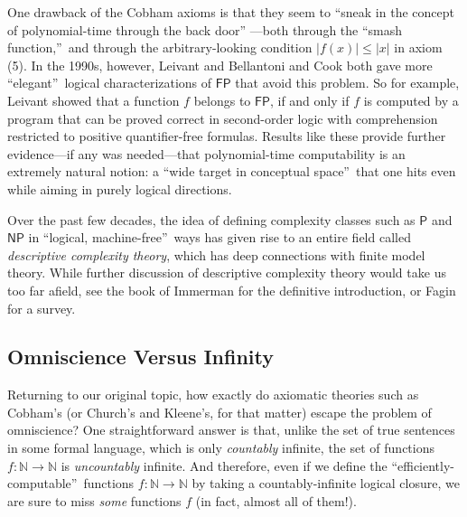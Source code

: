 \documentclass[12pt,onecolumn]{article}%
\begin{document}
One drawback of the Cobham axioms is that they seem to \textquotedblleft sneak
in the concept of polynomial-time through the back door\textquotedblright
---both through the \textquotedblleft smash function,\textquotedblright\  and
through the arbitrary-looking condition $\left\vert f(x)
\right\vert \leq\left\vert x\right\vert $ in axiom (5). In the 1990s,
however, Leivant \cite{leivant} and Bellantoni and Cook \cite{bellantonicook}
both gave more \textquotedblleft elegant\textquotedblright\  logical
characterizations of $\mathsf{FP}$ that avoid this problem. So for example,
Leivant showed that a function $f$ belongs to $\mathsf{FP}$, if and only if
$f$ is computed by a program that can be proved correct in second-order logic
with comprehension restricted to positive quantifier-free formulas. Results
like these provide further evidence---if any was needed---that polynomial-time
computability is an extremely natural notion: a \textquotedblleft wide target
in conceptual space\textquotedblright\  that one hits even while aiming in
purely logical directions.

Over the past few decades, the idea of defining complexity classes such as
$\mathsf{P}$ and $\mathsf{NP}$ in \textquotedblleft logical,
machine-free\textquotedblright\  ways has given rise to an entire field called
\textit{descriptive complexity theory}, which has deep connections with finite
model theory. While further discussion of descriptive complexity theory
would take us too far afield, see the book of Immerman \cite{immerman} for
the definitive introduction, or Fagin \cite{fagin} for a survey.

\subsection{Omniscience Versus Infinity\label{OMNIINF}}

Returning to our original topic, how exactly do axiomatic theories such as
Cobham's (or Church's and Kleene's, for that matter) escape the problem of
omniscience? One straightforward answer is that, unlike the set of true
sentences in some formal language, which is only \textit{countably} infinite,
the set of functions $f:\mathbb{N}\rightarrow\mathbb{N}$ is
\textit{uncountably} infinite. And therefore, even if we define the
\textquotedblleft efficiently-computable\textquotedblright\  functions
$f:\mathbb{N}\rightarrow\mathbb{N}$ by taking a countably-infinite logical
closure, we are sure to miss \textit{some} functions $f$ (in fact, almost all
of them!).
\end{document}
